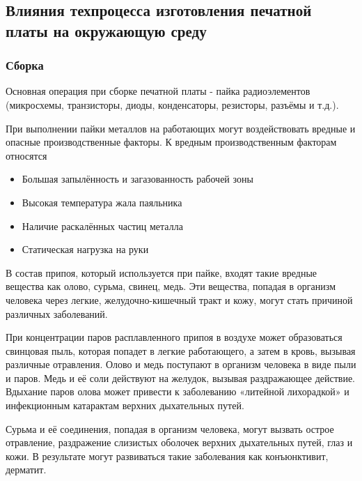 \newpage

\subsection{Влияния техпроцесса изготовления печатной платы на окружающую среду}

\subsubsection{Сборка}

Основная операция при сборке печатной платы - пайка радиоэлементов (микросхемы,
транзисторы, диоды, конденсаторы, резисторы, разъёмы и т.д.).

При выполнении пайки металлов на работающих могут воздействовать вредные и опасные
производственные факторы. К вредным производственным факторам относятся
\begin{itemize}
    \item Большая запылённость и загазованность рабочей зоны
    \item Высокая температура жала паяльника
    \item Наличие раскалённых частиц металла
    \item Статическая нагрузка на руки
\end{itemize}

В состав припоя, который используется при пайке, входят такие вредные вещества
как олово, сурьма, свинец, медь. Эти вещества, попадая в организм человека через
легкие, желудочно-кишечный тракт и кожу, могут стать причиной различных заболеваний.

При концентрации паров расплавленного припоя в воздухе может образоваться
свинцовая пыль, которая попадет в легкие работающего, а затем в кровь, вызывая
различные отравления. Олово и медь поступают в организм человека в виде пыли и
паров. Медь и её соли действуют на желудок, вызывая раздражающее действие.
Вдыхание паров олова может привести к заболеванию «литейной лихорадкой» и
инфекционным катарактам верхних дыхательных путей.

Сурьма и её соединения, попадая в организм человека, могут вызвать острое
отравление, раздражение слизистых оболочек верхних дыхательных путей, глаз и кожи.
В результате могут развиваться такие заболевания как конъюнктивит, дерматит.

